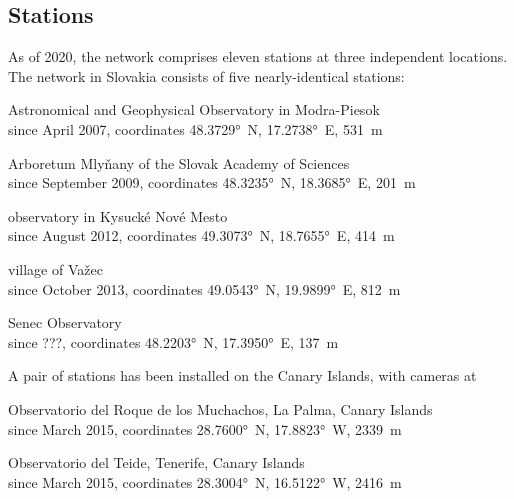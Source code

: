     \subsection{Stations} \label{iAs}
        As of 2020, the network comprises eleven stations at three independent locations.
        The network in Slovakia consists of five nearly-identical stations:
        \begin{description}[leftmargin = 25mm]
            \item[AGO]      Astronomical and Geophysical Observatory in Modra-Piesok\\
                            since April 2007, coordinates \ang{48.3729}~N, \ang{17.2738}~E, \SI{531}{\metre}
            \item[ARBO]     Arboretum Mlyňany of the Slovak Academy of Sciences\\
                            since September 2009, coordinates \ang{48.3235}~N, \ang{18.3685}~E, \SI{201}{\metre}
            \item[KNM]      observatory in Kysucké Nové Mesto\\
                            since August 2012, coordinates \ang{49.3073}~N, \ang{18.7655}~E, \SI{414}{\metre}
            \item[VAZEC]    village of Važec\\
                            since October 2013, coordinates \ang{49.0543}~N, \ang{19.9899}~E, \SI{812}{\metre}
            \item[SENEC]    Senec Observatory\\
                            since ???, coordinates \ang{48.2203}~N, \ang{17.3950}~E, \SI{137}{\metre} 
        \end{description}

        A pair of stations has been installed on the Canary Islands, with cameras at
        \begin{description}[leftmargin = 25mm]
            \item[LP]       Observatorio del Roque de los Muchachos, La Palma, Canary Islands\\
                            since March 2015, coordinates \ang{28.7600}~N, \ang{17.8823}~W, \SI{2339}{\metre}
            \item[TE]       Observatorio del Teide, Tenerife, Canary Islands\\
                            since March 2015, coordinates \ang{28.3004}~N, \ang{16.5122}~W, \SI{2416}{\metre}
        \end{description}


